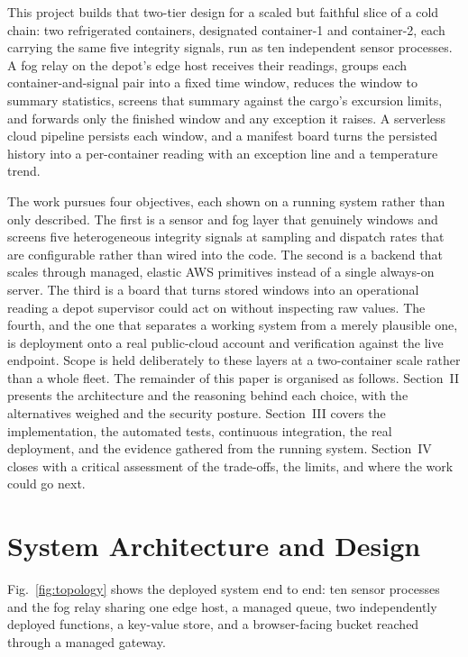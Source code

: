 \documentclass[conference]{IEEEtran}
\begin{document}
This project builds that two-tier design for a scaled but faithful slice of a cold chain: two refrigerated containers, designated container-1 and container-2, each carrying the same five integrity signals, run as ten independent sensor processes. A fog relay on the depot's edge host receives their readings, groups each container-and-signal pair into a fixed time window, reduces the window to summary statistics, screens that summary against the cargo's excursion limits, and forwards only the finished window and any exception it raises. A serverless cloud pipeline persists each window, and a manifest board turns the persisted history into a per-container reading with an exception line and a temperature trend.

The work pursues four objectives, each shown on a running system rather than only described. The first is a sensor and fog layer that genuinely windows and screens five heterogeneous integrity signals at sampling and dispatch rates that are configurable rather than wired into the code. The second is a backend that scales through managed, elastic AWS primitives instead of a single always-on server. The third is a board that turns stored windows into an operational reading a depot supervisor could act on without inspecting raw values. The fourth, and the one that separates a working system from a merely plausible one, is deployment onto a real public-cloud account and verification against the live endpoint. Scope is held deliberately to these layers at a two-container scale rather than a whole fleet. The remainder of this paper is organised as follows. Section~II presents the architecture and the reasoning behind each choice, with the alternatives weighed and the security posture. Section~III covers the implementation, the automated tests, continuous integration, the real deployment, and the evidence gathered from the running system. Section~IV closes with a critical assessment of the trade-offs, the limits, and where the work could go next.

\section{System Architecture and Design}

Fig.~\ref{fig:topology} shows the deployed system end to end: ten sensor processes and the fog relay sharing one edge host, a managed queue, two independently deployed functions, a key-value store, and a browser-facing bucket reached through a managed gateway.
\end{document}
